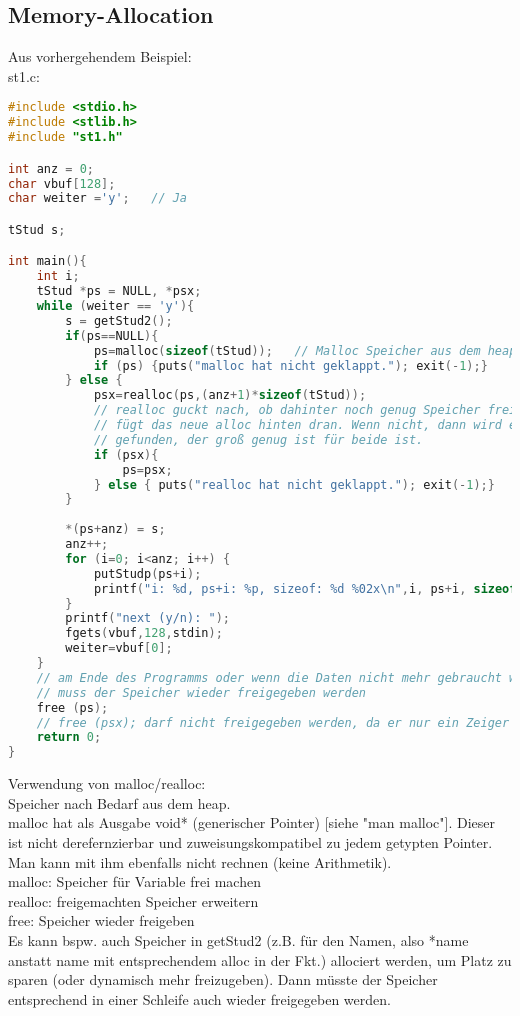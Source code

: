 \subsection{Memory-Allocation}
Aus vorhergehendem Beispiel:\\
st1.c:
\begin{lstlisting}[language=C]
#include <stdio.h>
#include <stlib.h>
#include "st1.h"

int anz = 0;
char vbuf[128];
char weiter ='y';	// Ja

tStud s;

int main(){
	int i;
	tStud *ps = NULL, *psx;
	while (weiter == 'y'){
		s = getStud2();
		if(ps==NULL){
			ps=malloc(sizeof(tStud));	// Malloc Speicher aus dem heap
			if (ps) {puts("malloc hat nicht geklappt."); exit(-1);}
		} else {
			psx=realloc(ps,(anz+1)*sizeof(tStud));
			// realloc guckt nach, ob dahinter noch genug Speicher frei ist und
			// fügt das neue alloc hinten dran. Wenn nicht, dann wird ein neuer Speicherbereich
			// gefunden, der groß genug ist für beide ist.
			if (psx){
				ps=psx;
			} else { puts("realloc hat nicht geklappt."); exit(-1);}
		}
		
		*(ps+anz) = s;
		anz++;
		for (i=0; i<anz; i++) {
			putStudp(ps+i);
			printf("i: %d, ps+i: %p, sizeof: %d %02x\n",i, ps+i, sizeof(tStud),sizeof(tStud));
		}
		printf("next (y/n): ");
		fgets(vbuf,128,stdin); 
		weiter=vbuf[0];
	}
	// am Ende des Programms oder wenn die Daten nicht mehr gebraucht werden
	// muss der Speicher wieder freigegeben werden
	free (ps);
	// free (psx); darf nicht freigegeben werden, da er nur ein Zeiger auf den ps ist.
	return 0;
}
\end{lstlisting}
Verwendung von malloc/realloc:\\
Speicher nach Bedarf aus dem heap.\\
malloc hat als Ausgabe void* (generischer Pointer) [siehe "man malloc"]. Dieser ist nicht derefernzierbar und zuweisungskompatibel zu jedem getypten Pointer. Man kann mit ihm ebenfalls nicht rechnen (keine Arithmetik).\\
malloc: Speicher für Variable frei machen\\
realloc: freigemachten Speicher erweitern\\
free: Speicher wieder freigeben\bigskip\\
Es kann bspw. auch Speicher in getStud2 (z.B. für den Namen, also *name anstatt name mit entsprechendem alloc in der Fkt.) allociert werden, um Platz zu sparen (oder dynamisch mehr freizugeben). Dann müsste der Speicher entsprechend in einer Schleife auch wieder freigegeben werden.

